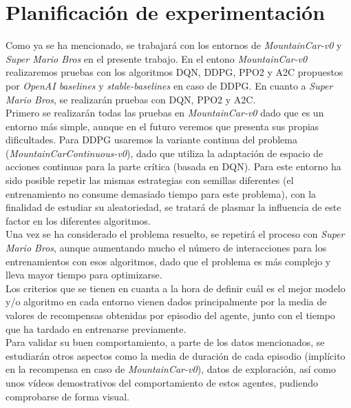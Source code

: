 \documentclass[11pt,fleqn]{book} %
\begin{document}
\section{Planificación de experimentación} 

Como ya se ha mencionado, se trabajará con los entornos de \textit{MountainCar-v0} y \textit{Super Mario Bros} en el presente trabajo. En el entono \textit{MountainCar-v0} realizaremos pruebas con los algoritmos DQN, DDPG, PPO2 y A2C propuestos por \textit{OpenAI baselines} y \textit{stable-baselines} en caso de DDPG. En cuanto a \textit{Super Mario Bros}, se realizarán pruebas con DQN, PPO2 y A2C. \\

Primero se realizarán todas las pruebas en \textit{MountainCar-v0} dado que es un entorno más simple, aunque en el futuro veremos que presenta sus propias dificultades. Para DDPG usaremos la variante continua del problema (\textit{MountainCarContinuous-v0}), dado que utiliza la adaptación de espacio de acciones continuas para la parte crítica (basada en DQN). Para este entorno ha sido posible repetir las mismas estrategias con semillas diferentes (el entrenamiento no consume demasiado tiempo para este problema), con la finalidad de estudiar su aleatoriedad, se tratará de plasmar la influencia de este factor en los diferentes algoritmos. \\ 

Una vez se ha considerado el problema resuelto, se repetirá el proceso con \textit{Super Mario Bros}, aunque aumentando mucho el número de interacciones para los entrenamientos con esos algoritmos, dado que el problema es más complejo y lleva mayor tiempo para optimizarse. \\

Los criterios que se tienen en cuanta a la hora de definir cuál es el mejor modelo y/o algoritmo en cada entorno vienen dados principalmente por la media de valores de recompensas obtenidas por episodio del agente, junto con el tiempo que ha tardado en entrenarse previamente. \\

Para validar su buen comportamiento, a parte de los datos mencionados, se estudiarán otros aspectos como la media de duración de cada episodio (implícito en la recompensa en caso de \textit{MountainCar-v0}), datos de exploración, así como unos vídeos demostrativos del comportamiento de estos agentes, pudiendo comprobarse de forma visual. \\
\end{document}
